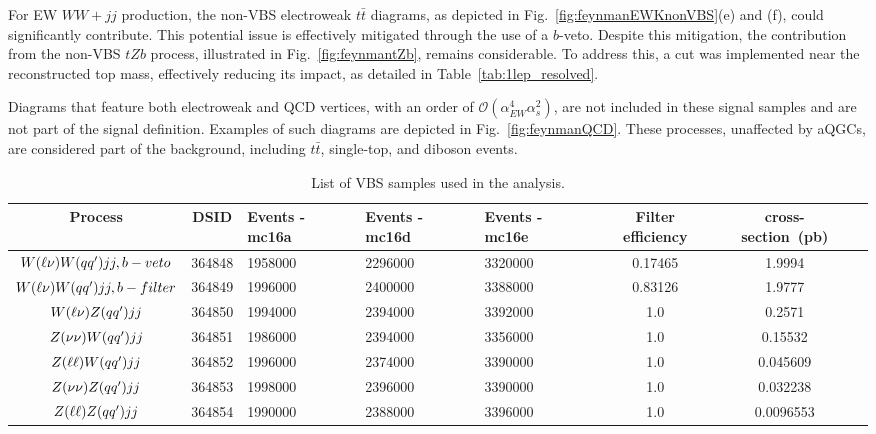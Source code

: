 For EW $WW+jj$ production, the non-VBS electroweak $t\bar{t}$ diagrams, as depicted in Fig.~\ref{fig:feynmanEWKnonVBS}(e) and (f), could significantly contribute. This potential issue is effectively mitigated through the use of a $b$-veto. Despite this mitigation, the contribution from the non-VBS $tZb$ process, illustrated in Fig.~\ref{fig:feynmantZb}, remains considerable. To address this, a cut was implemented near the reconstructed top mass, effectively reducing its impact, as detailed in Table~\ref{tab:1lep_resolved}.

Diagrams that feature both electroweak and QCD vertices, with an order of $\mathcal{O}(\alpha_{EW}^{4} \alpha_s^{2})$, are not included in these signal samples and are not part of the signal definition.
Examples of such diagrams are depicted in Fig.~\ref{fig:feynmanQCD}. These processes, unaffected by aQGCs, are considered part of the background, including $t\bar{t}$, single-top, and diboson events.

\begin{table}[!htbp]
\begin{center}
\small
\caption{List of VBS samples used in the analysis.}
\begin{tabularx}{\textwidth}{|c|c|X|X|X|c|c|c|}
\hline
Process & DSID & Events - mc16a & Events - mc16d & Events - mc16e & Filter efficiency & cross-section~(pb) \\
\hline

$W(\ell\nu)W(q q^{\prime}) jj, b-veto$    & 364848   &   1958000 &  2296000 & 3320000 & 0.17465  &  1.9994  \\
$W(\ell\nu)W(q q^{\prime}) jj, b-filter$  & 364849   &   1996000 &  2400000 & 3388000 & 0.83126  &  1.9777  \\
$W(\ell\nu)Z(q q^{\prime}) jj$            & 364850   &   1994000 &  2394000 & 3392000 & 1.0  &  0.2571  \\
$Z(\nu\nu)W(q q^{\prime}) jj$            & 364851   &   1986000 &  2394000 & 3356000 & 1.0  &  0.15532  \\
$Z(\ell\ell)W(q q^{\prime}) jj$            & 364852   &   1996000 &  2374000 & 3390000 & 1.0  &  0.045609  \\
$Z(\nu\nu)Z(q q^{\prime}) jj$            & 364853   &   1998000 &  2396000 & 3390000 & 1.0  &  0.032238  \\
$Z(\ell\ell)Z(q q^{\prime}) jj$            & 364854   &   1990000 &  2388000 & 3396000 & 1.0  &  0.0096553  \\

\hline
\end{tabularx}
\label{tab:VBS_sig_samples}
\end{center}
\end{table}

